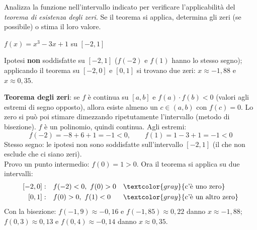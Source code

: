 \begin{question}[ID=3.4, subtitle={Teorema degli zeri per $x^3-3x+1$ su $[-2,1]$}, tags={continuità, teorema degli zeri}, difficulty=media]
Analizza la funzione nell'intervallo indicato per verificare l'applicabilità del \textit{teorema di esistenza degli zeri}. Se il teorema si applica, determina gli zeri (se possibile) o stima il loro valore.
\begin{center}
    $f(x) = x^3 - 3x + 1$ su $[-2, 1]$
\end{center}
\begin{solution}
Ipotesi \textbf{non} soddisfatte su $[-2,1]$ ($f(-2)$ e $f(1)$ hanno lo stesso segno); applicando il teorema su $[-2,0]$ e $[0,1]$ si trovano due zeri: $x\approx-1{,}88$ e $x\approx0{,}35$.
\end{solution}
\begin{explanation}
\textbf{Teorema degli zeri}: se $f$ è continua su $[a,b]$ e $f(a)\cdot f(b)<0$ (valori agli estremi di segno opposto), allora esiste almeno un $c\in(a,b)$ con $f(c)=0$. Lo zero si può poi stimare dimezzando ripetutamente l'intervallo (metodo di bisezione).
$f$ è un polinomio, quindi continua. Agli estremi:
\[ f(-2)=-8+6+1=-1<0, \qquad f(1)=1-3+1=-1<0 \]
Stesso segno: le ipotesi non sono soddisfatte sull'intervallo $[-2,1]$ (il che non esclude che ci siano zeri). \\
Provo un punto intermedio: $f(0)=1>0$. Ora il teorema si applica su due intervalli:
\[\begin{aligned}
[-2,0]: &\quad f(-2)<0,\ f(0)>0 && \textcolor{gray}{\text{c'è uno zero}}\\
[0,1]: &\quad f(0)>0,\ f(1)<0 && \textcolor{gray}{\text{c'è un altro zero}}
\end{aligned}\]
Con la bisezione: $f(-1{,}9)\approx-0{,}16$ e $f(-1{,}85)\approx0{,}22$ danno $x\approx-1{,}88$; \ $f(0{,}3)\approx0{,}13$ e $f(0{,}4)\approx-0{,}14$ danno $x\approx0{,}35$.
\end{explanation}
\end{question}


